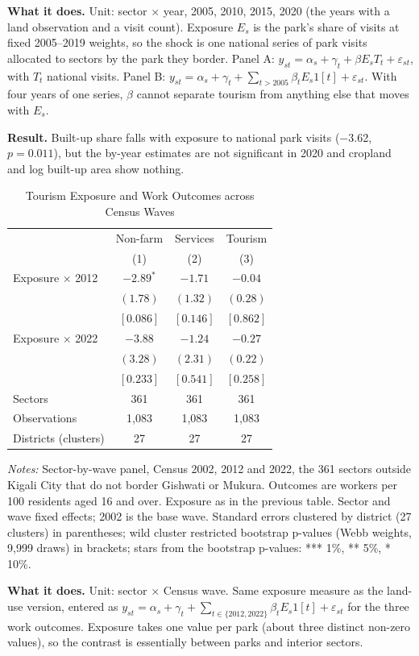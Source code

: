 \documentclass[11pt]{article}
\begin{document}
\textbf{What it does.} Unit: sector $\times$ year, 2005, 2010, 2015, 2020 (the years with a land observation and a visit count). Exposure $E_s$ is the park's share of visits at fixed 2005--2019 weights, so the shock is one national series of park visits allocated to sectors by the park they border. Panel A: $y_{st} = \alpha_s + \gamma_t + \beta E_s T_t + \varepsilon_{st}$, with $T_t$ national visits. Panel B: $y_{st} = \alpha_s + \gamma_t + \sum_{t>2005}\beta_t E_s 1[t] + \varepsilon_{st}$. With four years of one series, $\beta$ cannot separate tourism from anything else that moves with $E_s$.

\textbf{Result.} Built-up share falls with exposure to national park visits ($-$3.62, $p=0.011$), but the by-year estimates are not significant in 2020 and cropland and log built-up area show nothing.
\clearpage
\begin{table}[H]
\centering\small\setlength{\tabcolsep}{4pt}
\caption{Tourism Exposure and Work Outcomes across Census Waves}
\label{tab:shift_census}
\begin{tabular}{lccc}
\toprule
 & Non-farm & Services & Tourism \\
 & (1) & (2) & (3) \\
\midrule
Exposure $\times$ 2012 & $-2.89^{*}$ & $-1.71$ & $-0.04$ \\
 & $(1.78)$ & $(1.32)$ & $(0.28)$ \\
 & $[0.086]$ & $[0.146]$ & $[0.862]$ \\
Exposure $\times$ 2022 & $-3.88$ & $-1.24$ & $-0.27$ \\
 & $(3.28)$ & $(2.31)$ & $(0.22)$ \\
 & $[0.233]$ & $[0.541]$ & $[0.258]$ \\
\midrule
Sectors & 361 & 361 & 361 \\
Observations & 1,083 & 1,083 & 1,083 \\
Districts (clusters) & 27 & 27 & 27 \\
\bottomrule
\end{tabular}
\begin{minipage}{0.95\textwidth}\footnotesize
\textit{Notes:} Sector-by-wave panel, Census 2002, 2012 and 2022, the 361 sectors outside Kigali City that do not border Gishwati or Mukura. Outcomes are workers per 100 residents aged 16 and over. Exposure as in the previous table. Sector and wave fixed effects; 2002 is the base wave. Standard errors clustered by district (27 clusters) in parentheses; wild cluster restricted bootstrap p-values (Webb weights, 9,999 draws) in brackets; stars from the bootstrap p-values: *** 1\%, ** 5\%, * 10\%.
\end{minipage}
\end{table}
\textbf{What it does.} Unit: sector $\times$ Census wave. Same exposure measure as the land-use version, entered as $y_{st} = \alpha_s + \gamma_t + \sum_{t\in\{2012,2022\}}\beta_t E_s 1[t] + \varepsilon_{st}$ for the three work outcomes. Exposure takes one value per park (about three distinct non-zero values), so the contrast is essentially between parks and interior sectors.
\end{document}
